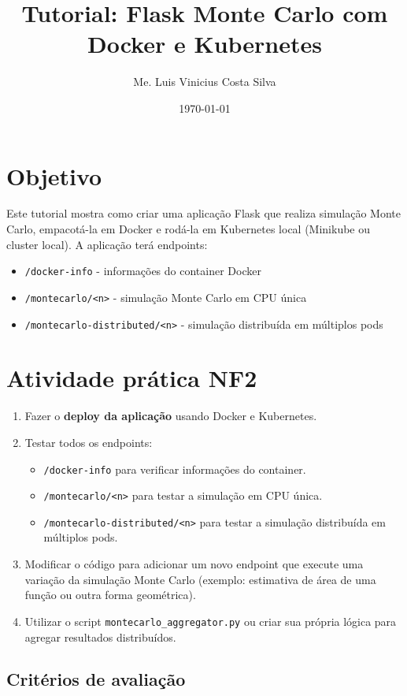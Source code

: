 \documentclass[a4paper,12pt]{article}
\title{Tutorial: Flask Monte Carlo com Docker e Kubernetes}
\author{Me. Luis Vinicius Costa Silva}
\date{\today}
\begin{document}
\maketitle

\section{Objetivo}
Este tutorial mostra como criar uma aplicação Flask que realiza simulação Monte Carlo, empacotá-la em Docker e rodá-la em Kubernetes local (Minikube ou cluster local). A aplicação terá endpoints:

\begin{itemize}
    \item \texttt{/docker-info} - informações do container Docker
    \item \texttt{/montecarlo/<n>} - simulação Monte Carlo em CPU única
    \item \texttt{/montecarlo-distributed/<n>} - simulação distribuída em múltiplos pods
\end{itemize}

\section*{Atividade prática NF2}


\begin{enumerate}
    \item Fazer o \textbf{deploy da aplicação} usando Docker e Kubernetes.
    \item Testar todos os endpoints:
    \begin{itemize}
        \item \texttt{/docker-info} para verificar informações do container.
        \item \texttt{/montecarlo/<n>} para testar a simulação em CPU única.
        \item \texttt{/montecarlo-distributed/<n>} para testar a simulação distribuída em múltiplos pods.
    \end{itemize}
    \item Modificar o código para adicionar um novo endpoint que execute uma variação da simulação Monte Carlo (exemplo: estimativa de área de uma função ou outra forma geométrica).
    \item Utilizar o script \texttt{montecarlo\_aggregator.py} ou criar sua própria lógica para agregar resultados distribuídos.
\end{enumerate}

\subsection*{Critérios de avaliação}
\end{document}
